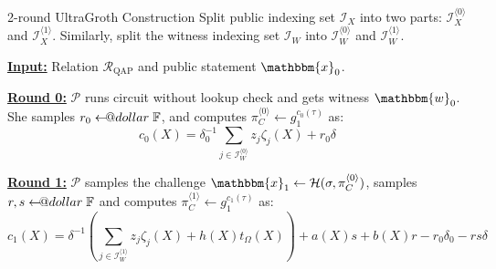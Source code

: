 \documentclass{zkdl-presentation-template}
\makeatletter
\newcommand\leftarrowS{\leftarrow\joinrel\smalldollar}
\newcommand{\smalldollar}{\mathrel{\mathpalette\small@dollar\relax}}
\newcommand{\small@dollar}[2]{%
  \vcenter{\hbox{%
    $#1\textnormal{\fontsize{0.7\dimexpr\f@size pt}{0}\selectfont\$}$%
  }}%
}
\makeatother
\begin{document}
    \begin{frame}{2-round UltraGroth Construction}
        Split public indexing set $\mathcal{I}_X$ into two parts:
        $\mathcal{I}_X^{\langle 0 \rangle}$ and $\mathcal{I}_X^{\langle 1
        \rangle}$. Similarly, split the witness indexing set $\mathcal{I}_W$
        into $\mathcal{I}_W^{\langle 0 \rangle}$ and $\mathcal{I}_W^{\langle 1
        \rangle}$.\pause

        \underline{\textbf{Input:}} Relation $\mathcal{R}_{\text{QAP}}$ and public statement
        $\mathbbm{x}_0$.\pause

        \underline{\textbf{Round 0:}} $\mathcal{P}$ runs circuit without lookup
        check and gets witness $\mathbbm{w}_0$. She samples $r_0 \leftarrowS
        \mathbb{F}$, and computes $\pi_C^{\langle 0 \rangle} \gets
        g_1^{c_0(\tau)}$ as:
        \begin{equation*}
            c_0(X) = \delta_0^{-1}\sum_{j \in \mathcal{I}_W^{\langle 0 \rangle}} z_j\zeta_j(X) + r_0\delta
        \end{equation*}

        \pause\underline{\textbf{Round 1:}} $\mathcal{P}$ samples the challenge $\mathbbm{x}_1 \gets \mathcal{H}(\sigma,\pi_C^{\langle 0 \rangle})$,
        samples $r,s \leftarrowS \mathbb{F}$ and computes $\pi_C^{\langle 1 \rangle} \gets g_1^{c_1(\tau)}$ as:
        \begin{equation*}
            c_1(X) = \delta^{-1}\left(\sum_{j \in \mathcal{I}_W^{\langle 1 \rangle}} z_j\zeta_j(X)+h(X)t_{\Omega}(X)\right) + a(X)s + b(X)r - r_0\delta_0 - rs\delta
        \end{equation*}
    \end{frame}
\end{document}
